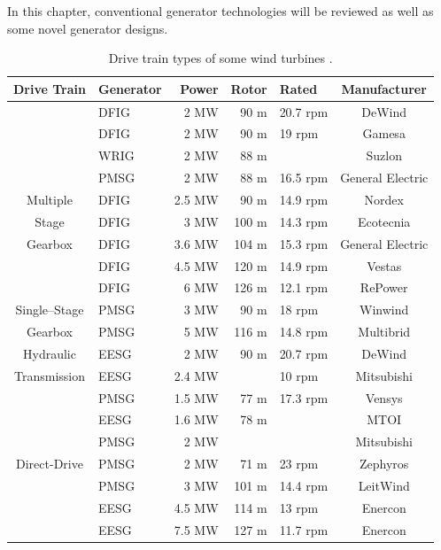 \documentclass[a4paper, 11pt]{article} %
\begin{document}
In this chapter, conventional generator technologies will be reviewed as well as some novel generator designs.


\begin{table}[t]
  \centering
  \begin{tabular}{clrrlc}
	  
	  Drive Train & Generator & Power & Rotor & Rated & Manufacturer \\
	  \hline
		& DFIG & 2 MW & 90 m & 20.7 rpm & DeWind \\
		& DFIG & 2 MW & 90 m & 19 rpm & Gamesa \\
	  	& WRIG & 2 MW & 88 m &  & Suzlon \\
	  	& PMSG & 2 MW & 88 m & 16.5 rpm & General Electric \\
	 Multiple 	& DFIG & 2.5 MW & 90 m & 14.9 rpm & Nordex \\
	Stage  	& DFIG & 3 MW & 100 m & 14.3 rpm & Ecotecnia \\
  	Gearbox & DFIG & 3.6 MW & 104 m & 15.3 rpm & General Electric \\
	  	& DFIG & 4.5 MW & 120 m & 14.9 rpm & Vestas \\
	  	& DFIG & 6 MW & 126 m & 12.1 rpm & RePower \\
	  	\hline
	Single--Stage  	& PMSG & 3 MW & 90 m & 18 rpm & Winwind \\
	Gearbox  	& PMSG & 5 MW & 116 m & 14.8 rpm & Multibrid \\
	  	\hline
	 Hydraulic 	& EESG & 2 MW & 90 m & 20.7 rpm & DeWind \\
	 Transmission 	& EESG & 2.4 MW &  & 10 rpm & Mitsubishi \\
	  	\hline
	  	& PMSG & 1.5 MW & 77 m & 17.3 rpm & Vensys \\
	  	& EESG & 1.6 MW & 78 m &  & MTOI \\
	  	& PMSG & 2 MW &  &  & Mitsubishi \\
	Direct-Drive  	& PMSG & 2 MW & 71 m & 23 rpm & Zephyros \\
	  	& PMSG & 3 MW & 101 m & 14.4 rpm & LeitWind \\
	  	& EESG & 4.5 MW & 114 m & 13 rpm & Enercon \\
	  	& EESG & 7.5 MW & 127 m & 11.7 rpm & Enercon \\
	  \hline

  \end{tabular}
  \caption{Drive train types of some wind turbines \cite{wind_energy_facts,upwind2011}.}
  \label{generator_manufacturers}
\end{table}
\end{document}
